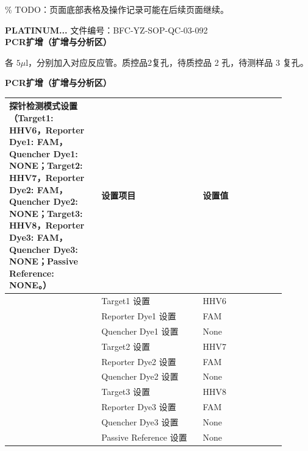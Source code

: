 \documentclass[UTF8,10pt,a4paper,fontset=fandol]{ctexart}
\newcommand{\fieldvalue}[1]{#1}
\newcommand{\handwritten}[1]{#1}
\begin{document}
\noindent
\% TODO：页面底部表格及操作记录可能在后续页面继续。

\newpage

\noindent
\textbf{PLATINUM...} \hfill 文件编号：BFC-YZ-SOP-QC-03-092\\
\textbf{PCR扩增（扩增与分析区）}

各 $5\mu\mathrm{l}$，分别加入对应反应管。质控品2复孔，待质控品
\fieldvalue{\handwritten{2}}
孔，待测样品
\fieldvalue{\handwritten{3}}
复孔。

\begin{center}
\textbf{PCR扩增（扩增与分析区）}
\end{center}

\begin{tabular}{|p{0.30\linewidth}|p{0.33\linewidth}|p{0.27\linewidth}|}
\hline
探针检测模式设置（Target1: HHV6，Reporter Dye1: FAM，Quencher Dye1: NONE；Target2: HHV7，Reporter Dye2: FAM，Quencher Dye2: NONE；Target3: HHV8，Reporter Dye3: FAM，Quencher Dye3: NONE；Passive Reference: NONE。） &
\textbf{设置项目} & \textbf{设置值} \\ \hline
& Target1 设置 &
\fieldvalue{\handwritten{HHV6}} \\ \hline
& Reporter Dye1 设置 &
\fieldvalue{\handwritten{FAM}} \\ \hline
& Quencher Dye1 设置 &
\fieldvalue{\handwritten{None}} \\ \hline
& Target2 设置 &
\fieldvalue{\handwritten{HHV7}} \\ \hline
& Reporter Dye2 设置 &
\fieldvalue{\handwritten{FAM}} \\ \hline
& Quencher Dye2 设置 &
\fieldvalue{\handwritten{None}} \\ \hline
& Target3 设置 &
\fieldvalue{\handwritten{HHV8}} \\ \hline
& Reporter Dye3 设置 &
\fieldvalue{\handwritten{FAM}} \\ \hline
& Quencher Dye3 设置 &
\fieldvalue{\handwritten{None}} \\ \hline
& Passive Reference 设置 &
\fieldvalue{\handwritten{None}} \\ \hline
\end{tabular}
\end{document}
